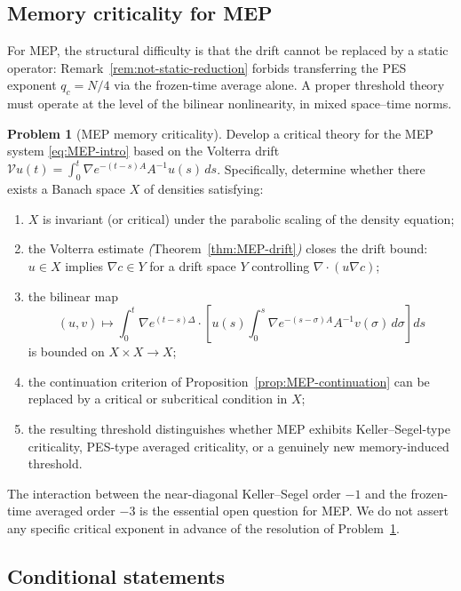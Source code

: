 \documentclass[11pt,reqno]{amsart}
\theoremstyle{definition}
\newtheorem{problem}[theorem]{Problem}
\theoremstyle{remark}
\newcommand{\Vop}{\mathcal{V}}
\newcommand{\Div}{\nabla\!\cdot}
\begin{document}
\subsection{Memory criticality for MEP}
\label{subsec:MEP-criticality}

For MEP, the structural difficulty is that the drift cannot be replaced by a static operator: Remark~\ref{rem:not-static-reduction} forbids transferring the PES exponent $q_c=N/4$ via the frozen-time average alone. A proper threshold theory must operate at the level of the bilinear nonlinearity, in mixed space--time norms.

\begin{problem}[MEP memory criticality]\label{prob:MEP-criticality}
Develop a critical theory for the MEP system \eqref{eq:MEP-intro} based on the Volterra drift $\Vop u(t)=\int_0^t\nabla e^{-(t-s)A}A^{-1}u(s)\,ds$. Specifically, determine whether there exists a Banach space $X$ of densities satisfying:
\begin{enumerate}[label=(\roman*),leftmargin=2em]
\item $X$ is invariant (or critical) under the parabolic scaling of the density equation;
\item the Volterra estimate \emph{(}Theorem~\ref{thm:MEP-drift}\emph{)} closes the drift bound: $u\in X$ implies $\nabla c\in Y$ for a drift space $Y$ controlling $\Div(u\nabla c)$;
\item the bilinear map
\[
        (u,v)\longmapsto\int_0^t \nabla e^{(t-s)\Delta}\!\cdot\!\left[u(s)\int_0^s\nabla e^{-(s-\sigma)A}A^{-1}v(\sigma)\,d\sigma\right]ds
\]
is bounded on $X\times X\to X$;
\item the continuation criterion of Proposition~\ref{prop:MEP-continuation} can be replaced by a critical or subcritical condition in $X$;
\item the resulting threshold distinguishes whether MEP exhibits Keller--Segel-type criticality, PES-type averaged criticality, or a genuinely new memory-induced threshold.
\end{enumerate}
\end{problem}

The interaction between the near-diagonal Keller--Segel order $-1$ and the frozen-time averaged order $-3$ is the essential open question for MEP. We do not assert any specific critical exponent in advance of the resolution of Problem~\ref{prob:MEP-criticality}.

\subsection{Conditional statements}
\label{subsec:conditional-statements}
\end{document}
